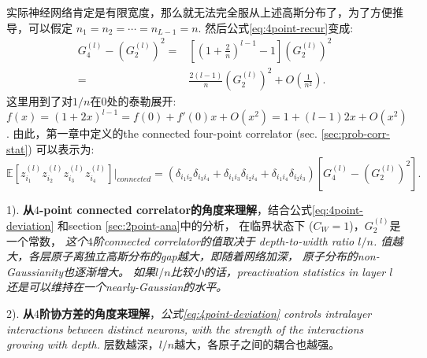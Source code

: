 实际神经网络肯定是有限宽度，那么就无法完全服从上述高斯分布了，为了方便推导，可以假定
$n_1 = n_2 = \cdots = n_{L-1} = n$. 然后公式\ref{eq:4point-recur}变成:
\begin{equation}
    \begin{aligned}
    G_4^{(l)} - (G_2^{(l)})^2 =& \left[\left( 1 + \frac{2}{n} \right)^{l-1}
        - 1\right]\left(G_2^{(l)}\right)^2 \\
        =& \frac{2(l-1)}{n}\left(G_2^{(l)}\right)^2 + O\left(\frac{1}{n^2}\right).
    \end{aligned}
    \label{eq:4point-deviation}
\end{equation}
这里用到了对$1/n$在$0$处的泰勒展开: 
$f(x)=(1+2x)^{l-1} = f(0) + f'(0)x + O(x^2) = 1 + (l-1)2x + O(x^2)$.
由此，第一章中定义的the connected four-point correlator (sec. \ref{sec:prob-corr-stat})
可以表示为:
\begin{equation}
    \mathbb{E}\left[ z_{i_1}^{(l)}z_{i_2}^{(l)}z_{i_3}^{(l)}z_{i_4}^{(l)} \right] |_{connected}
        = (\delta_{i_1i_2}\delta_{i_3i_4} + \delta_{i_1i_3}\delta_{i_2i_4}
            + \delta_{i_1i_4}\delta_{i_2i_3}) \left[G_4^{(l)} - (G_2^{(l)})^2\right].
\end{equation}

1). \textbf{从$4$-point connected correlator的角度来理解}，结合公式\ref{eq:4point-deviation}
和section \ref{sec:2point-ana}中的分析，
在临界状态下 ($C_W=1$)，$G_2^{(l)}$是一个常数， \emph{这个$4$阶connected correlator的值取决于
depth-to-width ratio $l/n$. 值越大，各层原子离独立高斯分布的gap越大，即随着网络加深，
原子分布的non-Gaussianity也逐渐增大。 如果$l/n$比较小的话，preactivation statistics in 
layer $l$ 还是可以维持在一个nearly-Gaussian的水平。}

2). \textbf{从$4$阶协方差的角度来理解}，\emph{公式\ref{eq:4point-deviation} controls intralayer 
interactions between distinct neurons, with the strength of the interactions 
growing with depth.} 层数越深，$l/n$越大，各原子之间的耦合也越强。

